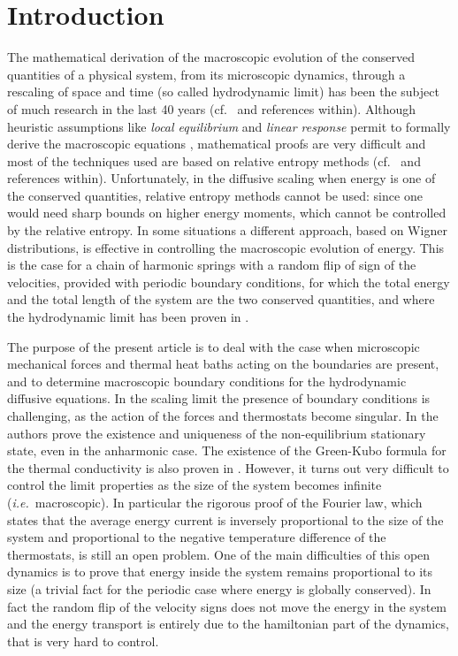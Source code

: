 \documentclass[EJP]{ejpecp} %
\numberwithin{equation}{section}
\begin{document}
\section{{Introduction}\label{sec:intro}}

The mathematical  derivation of the macroscopic evolution of the conserved quantities
of a physical system, from its microscopic dynamics, through a rescaling of space and time
(so called hydrodynamic limit) has been the subject of much research in the last 40 years
(cf.~\cite{KL} and references within). Although heuristic assumptions like \emph{local equilibrium} and
\emph{linear response} permit to formally derive the macroscopic equations \cite{spohn},
mathematical proofs are very difficult and most of the techniques used are based on relative
entropy methods (cf.~\cite{KL} and references within). Unfortunately,
in the diffusive scaling
when energy is one of the conserved quantities, relative entropy methods cannot be used: {since one would need sharp bounds on higher energy moments, which cannot be controlled by the relative entropy}.
In some situations a different approach, based on Wigner distributions, is effective in controlling the
macroscopic evolution of energy. This is the case for a chain of harmonic springs with a random flip
of sign of the velocities, provided with periodic boundary conditions, for which the total energy and the
total length of the system are the two conserved quantities,
and where the hydrodynamic limit has been proven in \cite{kos1}.

The purpose of the present article is to deal with the case when
microscopic mechanical forces and thermal heat baths acting on the boundaries {  are present}, 
and to determine macroscopic  boundary conditions for the hydrodynamic diffusive equations.
In the scaling limit the presence of  boundary conditions is challenging, as the action
of the forces and thermostats  become singular.
In \cite{bo2} the authors prove the existence and  uniqueness of the non-equilibrium stationary
state, even in the anharmonic case. The existence of the Green-Kubo formula for the
thermal conductivity is also proven in \cite{bo2}. However, it turns out very difficult to control the limit
properties as the size of the system becomes infinite (\textit{i.e.}~macroscopic).
In particular the rigorous proof of the Fourier law,
which states that the average energy current is inversely proportional
to the size of the system and proportional to the negative temperature difference of the thermostats, is still an open problem.
One of the main difficulties of this open dynamics is to prove that energy inside
the system remains proportional to its size
(a trivial fact for the periodic case where energy is globally conserved).
In fact the random flip of the velocity signs does not move the energy in the system
and the energy transport is entirely due to the hamiltonian part of the dynamics, that is very hard to control.
\end{document}
